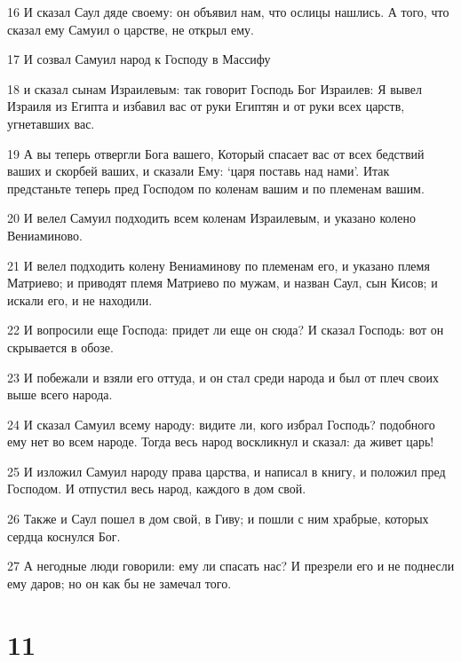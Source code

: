 \par 16 И сказал Саул дяде своему: он объявил нам, что ослицы нашлись. А того, что сказал ему Самуил о царстве, не открыл ему.
\par 17 И созвал Самуил народ к Господу в Массифу
\par 18 и сказал сынам Израилевым: так говорит Господь Бог Израилев: Я вывел Израиля из Египта и избавил вас от руки Египтян и от руки всех царств, угнетавших вас.
\par 19 А вы теперь отвергли Бога вашего, Который спасает вас от всех бедствий ваших и скорбей ваших, и сказали Ему: `царя поставь над нами'. Итак предстаньте теперь пред Господом по коленам вашим и по племенам вашим.
\par 20 И велел Самуил подходить всем коленам Израилевым, и указано колено Вениаминово.
\par 21 И велел подходить колену Вениаминову по племенам его, и указано племя Матриево; и приводят племя Матриево по мужам, и назван Саул, сын Кисов; и искали его, и не находили.
\par 22 И вопросили еще Господа: придет ли еще он сюда? И сказал Господь: вот он скрывается в обозе.
\par 23 И побежали и взяли его оттуда, и он стал среди народа и был от плеч своих выше всего народа.
\par 24 И сказал Самуил всему народу: видите ли, кого избрал Господь? подобного ему нет во всем народе. Тогда весь народ воскликнул и сказал: да живет царь!
\par 25 И изложил Самуил народу права царства, и написал в книгу, и положил пред Господом. И отпустил весь народ, каждого в дом свой.
\par 26 Также и Саул пошел в дом свой, в Гиву; и пошли с ним храбрые, которых сердца коснулся Бог.
\par 27 А негодные люди говорили: ему ли спасать нас? И презрели его и не поднесли ему даров; но он как бы не замечал того.

\chapter{11}

